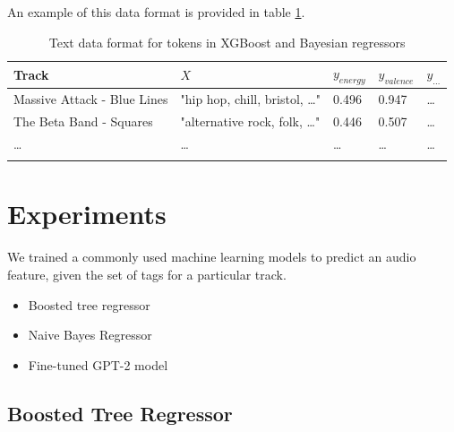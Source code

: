 \documentclass[sn-mathphys]{sn-jnl}%
\theoremstyle{thmstyleone}%
\theoremstyle{thmstyletwo}%
\theoremstyle{thmstylethree}%
\begin{document}
An example of this data format is provided in table \ref{text_format}.

\begin{table}[h]
      \begin{center}
      \begin{minipage}{\textwidth}
      \caption{Text data format for tokens in XGBoost and Bayesian regressors}\label{text_format}%
      \begin{tabular}{@{}lllll@{}}
      \toprule
      Track                         & $X$                                   & $y_{energy}$ & $y_{valence}$ & $y_{\dots}$ \\
      \midrule
      Massive Attack - Blue Lines   & "hip hop, chill, bristol, \dots"      & 0.496        & 0.947         & \dots  \\
      The Beta Band - Squares       & "alternative rock, folk, \dots"       & 0.446        & 0.507         & \dots \\
      \dots                         & \dots                                 & \dots        & \dots         & \dots  \\
      \botrule
      \end{tabular}
      \end{minipage}
      \end{center}
\end{table}


















\section{Experiments}

We trained a commonly used machine learning models to predict an audio feature, given the set of tags for a particular track.

\begin{itemize}
      \item Boosted tree regressor \cite{xgboost}
      \item Naive Bayes Regressor \cite{bayesian}
      \item Fine-tuned GPT-2 model
\end{itemize}

\subsection{Boosted Tree Regressor}
\end{document}
